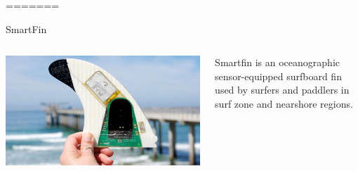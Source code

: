=======
\begin{frame}{SmartFin}
    \begin{columns}[c] 
        \begin{column}{0.5\textwidth}
            \centering
            \includegraphics[width=0.9\linewidth]{images/smartfin_picture.jpg}
        \end{column}
        \begin{column}{0.5\textwidth}
            \justifying
            Smartfin is an oceanographic sensor-equipped surfboard fin used by surfers and paddlers in surf zone and nearshore regions.
        \end{column}
    \end{columns}
\end{frame}
